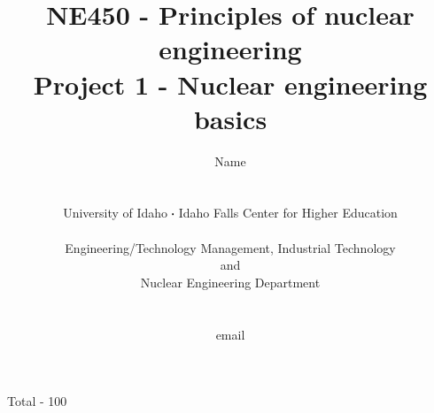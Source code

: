 \documentclass[11pt,a4paper]{article}
\newcommand*\sq{\mathbin{\vcenter{\hbox{\rule{.3ex}{.3ex}}}}} %
\begin{document}
\begin{titlepage}
    \title{
        NE450 - Principles of nuclear engineering\\
        Project 1 - Nuclear engineering basics\\
    }
    \author{
        Name
        \\ \\ \\
        University of Idaho $\sq$ Idaho Falls Center for Higher Education
        \\ \\
        Engineering/Technology Management, Industrial Technology\\and\\Nuclear Engineering Department
        \\ \\ \\
        email 
    }
\clearpage %
\maketitle
\vspace*{\fill}
\begin{flushright}{
        Total - 100
}
\end{flushright}
\thispagestyle{empty} %
\end{titlepage}
\end{document}
